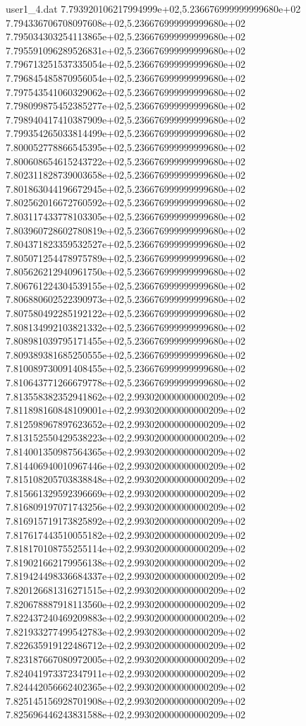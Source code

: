 \begin{filecontents}{user1_4.dat}
7.793920106217994999e+02,5.236676999999999680e+02
7.794336706708097608e+02,5.236676999999999680e+02
7.795034303254113865e+02,5.236676999999999680e+02
7.795591096289526831e+02,5.236676999999999680e+02
7.796713251537335054e+02,5.236676999999999680e+02
7.796845485870956054e+02,5.236676999999999680e+02
7.797543541060329062e+02,5.236676999999999680e+02
7.798099875452385277e+02,5.236676999999999680e+02
7.798940417410387909e+02,5.236676999999999680e+02
7.799354265033814499e+02,5.236676999999999680e+02
7.800052778866545395e+02,5.236676999999999680e+02
7.800608654615243722e+02,5.236676999999999680e+02
7.802311828739003658e+02,5.236676999999999680e+02
7.801863044196672945e+02,5.236676999999999680e+02
7.802562016672760592e+02,5.236676999999999680e+02
7.803117433778103305e+02,5.236676999999999680e+02
7.803960728602780819e+02,5.236676999999999680e+02
7.804371823359532527e+02,5.236676999999999680e+02
7.805071254478975789e+02,5.236676999999999680e+02
7.805626212940961750e+02,5.236676999999999680e+02
7.806761224304539155e+02,5.236676999999999680e+02
7.806880602522390973e+02,5.236676999999999680e+02
7.807580492285192122e+02,5.236676999999999680e+02
7.808134992103821332e+02,5.236676999999999680e+02
7.808981039795171455e+02,5.236676999999999680e+02
7.809389381685250555e+02,5.236676999999999680e+02
7.810089730091408455e+02,5.236676999999999680e+02
7.810643771266679778e+02,5.236676999999999680e+02
7.813558382352941862e+02,2.993020000000000209e+02
7.811898160848109001e+02,2.993020000000000209e+02
7.812598967897623652e+02,2.993020000000000209e+02
7.813152550429538223e+02,2.993020000000000209e+02
7.814001350987564365e+02,2.993020000000000209e+02
7.814406940010967446e+02,2.993020000000000209e+02
7.815108205703838848e+02,2.993020000000000209e+02
7.815661329592396669e+02,2.993020000000000209e+02
7.816809197071743256e+02,2.993020000000000209e+02
7.816915719173825892e+02,2.993020000000000209e+02
7.817617443510055182e+02,2.993020000000000209e+02
7.818170108755255114e+02,2.993020000000000209e+02
7.819021662179956138e+02,2.993020000000000209e+02
7.819424498336684337e+02,2.993020000000000209e+02
7.820126681316271515e+02,2.993020000000000209e+02
7.820678887918113560e+02,2.993020000000000209e+02
7.822437240469209883e+02,2.993020000000000209e+02
7.821933277499542783e+02,2.993020000000000209e+02
7.822635919122486712e+02,2.993020000000000209e+02
7.823187667080972005e+02,2.993020000000000209e+02
7.824041973372347911e+02,2.993020000000000209e+02
7.824442056662402365e+02,2.993020000000000209e+02
7.825145156928701908e+02,2.993020000000000209e+02
7.825696446243831588e+02,2.993020000000000209e+02

\end{filecontents}
